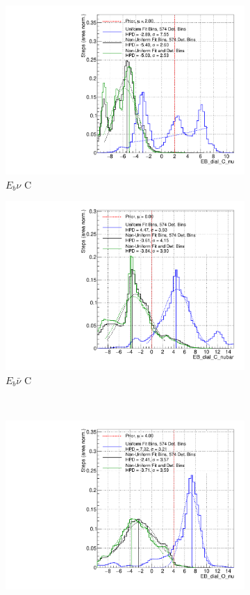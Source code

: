 \begin{figure}[!htbp]
\centering
\begin{subfigure}{.48\textwidth}
  \centering
  \includegraphics[width=0.73\linewidth]{figs/PolyComp_EB_dial_C_nu}
  \caption{$E_{b}\nu$ C}
\end{subfigure}
\begin{subfigure}{.48\textwidth}
  \centering
  \includegraphics[width=0.73\linewidth]{figs/PolyComp_EB_dial_C_nubar}
  \caption{$E_{b}\bar{\nu}$ C}
\end{subfigure} \\
\begin{subfigure}{.48\textwidth}
  \centering
  \includegraphics[width=0.73\linewidth]{figs/PolyComp_EB_dial_O_nu}

\end{subfigure}
\end{figure}
